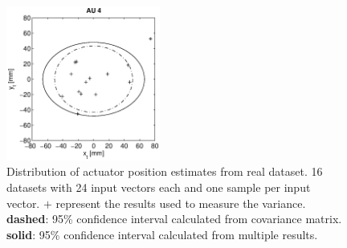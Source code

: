 \begin{figure}[hbtp]
\includegraphics[width = 0.45\textwidth]{images/results/real_confidence_95_interval_AU4.eps}
\caption{Distribution of actuator position estimates from real dataset. 16 datasets with 24 input vectors each and one sample per input vector.
$\mathbf{+}$ represent the results used to measure the variance.
\textbf{dashed}: 95\% confidence interval calculated from covariance matrix.
\textbf{solid}: 95\% confidence interval calculated from multiple results. }
\label{fig:result_95pc_real_confidence_all}
\end{figure}


